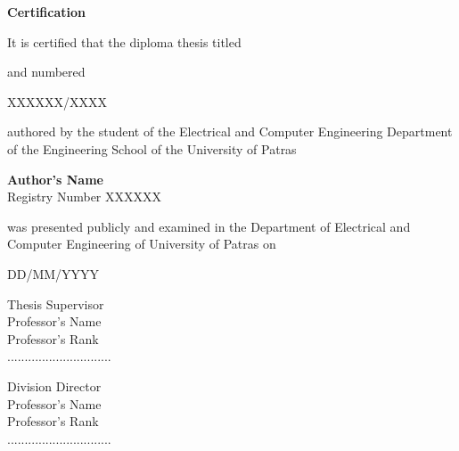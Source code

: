 \begin{center}

{\Large \textbf{Certification}}

\vspace{2cm}

It is certified that the diploma thesis titled

\vspace{1.5cm}

\EnglishThesisTitle

\vspace{1.5cm}

and numbered

\vspace{0.5cm}

{\large XXXXXX/XXXX}

\vspace{0.5cm}

authored by the student of the Electrical and Computer Engineering Department of the Engineering School of the University of Patras

\vspace{0.5cm}

{\large \textbf{Author's Name}}\\[0.2cm]
Registry Number XXXXXX

\vspace{0.5cm}

was presented publicly and examined in the Department of Electrical and Computer Engineering of University of Patras on

\vspace{0.5cm}

{\large DD/MM/YYYY}

\vspace{2cm}

\begin{minipage}{0.5\textwidth}
\centering
{\large Thesis Supervisor}\\[0.5cm]
Professor's Name\\
Professor's Rank \\[1.5cm]
..............................
\end{minipage}%
\begin{minipage}{0.5\textwidth}
\centering
{\large Division Director}\\[0.5cm]
Professor's Name\\
Professor's Rank\\[1.5cm]
..............................
\end{minipage}

\end{center}